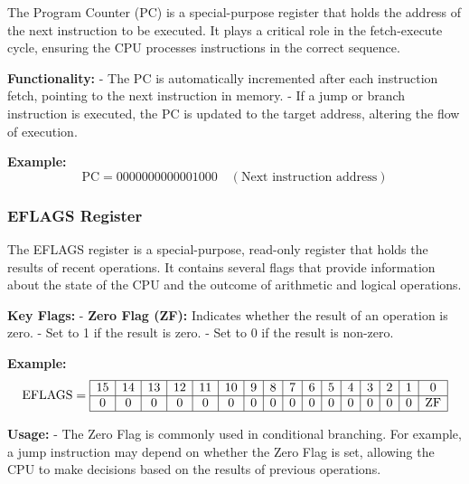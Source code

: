 \documentclass{report}
\begin{document}
The Program Counter (PC) is a special-purpose register that holds the address of the next instruction to be executed. It plays a critical role in the fetch-execute cycle, ensuring the CPU processes instructions in the correct sequence.

\textbf{Functionality:}
- The PC is automatically incremented after each instruction fetch, pointing to the next instruction in memory.
- If a jump or branch instruction is executed, the PC is updated to the target address, altering the flow of execution.

\textbf{Example:}
\[
	\text{PC} = 0000000000001000 \quad (\text{Next instruction address})
\]

\subsubsection{EFLAGS Register}

The EFLAGS register is a special-purpose, read-only register that holds the results of recent operations. It contains several flags that provide information about the state of the CPU and the outcome of arithmetic and logical operations.

\textbf{Key Flags:}
- \textbf{Zero Flag (ZF):} Indicates whether the result of an operation is zero.
- Set to 1 if the result is zero.
- Set to 0 if the result is non-zero.

\textbf{Example:}
\[
	\text{EFLAGS} = \begin{array}{|c|c|c|c|c|c|c|c|c|c|c|c|c|c|c|c|}
		\hline
		\text{15} & \text{14} & \text{13} & \text{12} & \text{11} & \text{10} & \text{9} & \text{8} & \text{7} & \text{6} & \text{5} & \text{4} & \text{3} & \text{2} & \text{1} & \text{0}  \\
		\hline
		0         & 0         & 0         & 0         & 0         & 0         & 0        & 0        & 0        & 0        & 0        & 0        & 0        & 0        & 0        & \text{ZF} \\
		\hline
	\end{array}
\]

\textbf{Usage:}
- The Zero Flag is commonly used in conditional branching. For example, a jump instruction may depend on whether the Zero Flag is set, allowing the CPU to make decisions based on the results of previous operations.
\end{document}
